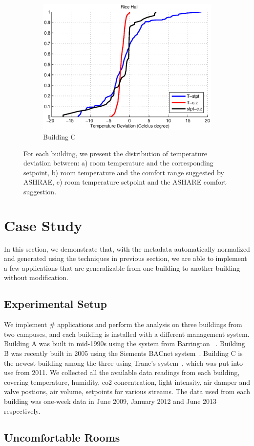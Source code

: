 \begin{figure}[ht!]
\begin{subfigure}{0.33\textwidth}
		\includegraphics[width=\textwidth]{./figs/Rice_new.eps}
                \caption{Building C}
	\end{subfigure}
\caption{For each building, we present the distribution of temperature deviation between: a) room temperature and the corresponding setpoint, b) room temperature and the comfort range suggested by ASHRAE, c) room temperature setpoint and the ASHARE comfort suggestion. }
\label{fig:cdf_temp}
\end{figure}

\section{Case Study}
In this section, we demonstrate that, with the metadata automatically normalized and generated using the techniques in previous section, we are able to implement a few applications that are generalizable from one building to another building without modification.

\subsection{Experimental Setup}
We implement \# applications and perform the analysis on three buildings from two campuses, and each building is installed with a different management system. Building A was built in mid-1990s using the system from Barrington ~\cite{}. Building B was recently built in 2005 using the Siements BACnet system~\cite{}. Building C is the newest building among the three using Trane's system~\cite{}, which was put into use from 2011. We collected all the available data readings from each building, covering temperature, humidity, co2 concentration, light intensity, air damper and valve postions, air volume, setpoints for various streams. The data used from each building was one-week data in June 2009, January 2012 and June 2013 respectively.
\subsection{Uncomfortable Rooms}
